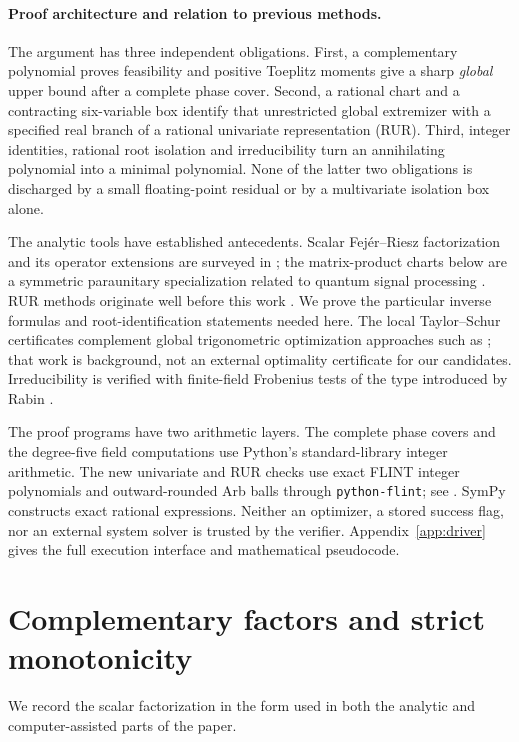\documentclass[11pt]{article}
\begin{document}
\paragraph{Proof architecture and relation to previous methods.}
The argument has three independent obligations. First, a complementary
polynomial proves feasibility and positive Toeplitz moments give a sharp
\emph{global} upper bound after a complete phase cover. Second, a rational
chart and a contracting six-variable box identify that unrestricted global
extremizer with a specified real branch of a rational univariate
representation (RUR). Third, integer identities, rational root isolation
and irreducibility turn an annihilating polynomial into a minimal polynomial.
None of the latter two obligations is discharged by a small floating-point
residual or by a multivariate isolation box alone.

The analytic tools have established antecedents. Scalar Fej\'er--Riesz
factorization and its operator extensions are surveyed in
\cite{DritschelRovnyak}; the matrix-product charts below are a symmetric
paraunitary specialization related to quantum signal processing
\cite{Haah2019}. RUR methods originate well before this work
\cite{Rouillier1999}. We prove the particular inverse formulas and
root-identification statements needed here. The local Taylor--Schur
certificates complement global trigonometric optimization approaches such
as \cite{BachRudi2023}; that work is background, not an external optimality
certificate for our candidates. Irreducibility is verified with finite-field
Frobenius tests of the type introduced by Rabin \cite{Rabin1980}.

The proof programs have two arithmetic layers. The complete phase covers
and the degree-five field computations use Python's standard-library
integer arithmetic. The new univariate and RUR checks use exact FLINT
integer polynomials and outward-rounded Arb balls through
\texttt{python-flint}; see \cite{Johansson2017}. SymPy constructs exact
rational expressions. Neither an optimizer, a stored success flag, nor an
external system solver is trusted by the verifier. Appendix~\ref{app:driver}
gives the full execution interface and mathematical pseudocode.

\section{Complementary factors and strict monotonicity}\label{sec:monotone}
We record the scalar factorization in the form used in both the analytic
and computer-assisted parts of the paper.
\end{document}
